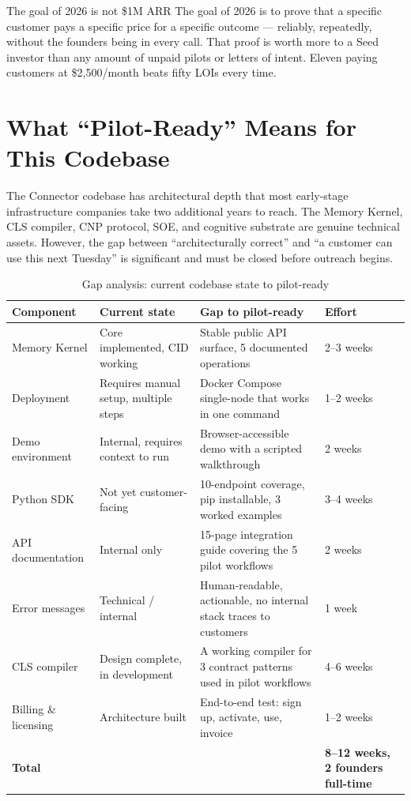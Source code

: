 \begin{insightbox}{The goal of 2026 is not \$1M ARR}
The goal of 2026 is to prove that a specific customer pays a specific price
for a specific outcome --- reliably, repeatedly, without the founders being
in every call. That proof is worth more to a Seed investor than any amount
of unpaid pilots or letters of intent. Eleven paying customers at
\$2,500/month beats fifty LOIs every time.
\end{insightbox}

\section*{What ``Pilot-Ready'' Means for This Codebase}

The Connector codebase has architectural depth that most early-stage
infrastructure companies take two additional years to reach. The Memory
Kernel, CLS compiler, CNP protocol, SOE, and cognitive substrate are
genuine technical assets. However, the gap between ``architecturally
correct'' and ``a customer can use this next Tuesday'' is significant and
must be closed before outreach begins.

\begin{table}[H]
\centering
\renewcommand{\arraystretch}{1.5}
\begin{tabularx}{\textwidth}{@{}lXll@{}}
\toprule
\textbf{Component} & \textbf{Current state} & \textbf{Gap to pilot-ready} &
\textbf{Effort} \\
\midrule
Memory Kernel      & Core implemented, CID working & Stable public API surface,
                     5 documented operations & 2--3 weeks \\
Deployment         & Requires manual setup, multiple steps & Docker Compose
                     single-node that works in one command & 1--2 weeks \\
Demo environment   & Internal, requires context to run & Browser-accessible
                     demo with a scripted walkthrough & 2 weeks \\
Python SDK         & Not yet customer-facing & 10-endpoint coverage, pip
                     installable, 3 worked examples & 3--4 weeks \\
API documentation  & Internal only & 15-page integration guide covering
                     the 5 pilot workflows & 2 weeks \\
Error messages     & Technical / internal & Human-readable, actionable, no
                     internal stack traces to customers & 1 week \\
CLS compiler       & Design complete, in development & A working compiler
                     for 3 contract patterns used in pilot workflows & 4--6 weeks \\
Billing \& licensing & Architecture built & End-to-end test: sign up, activate,
                     use, invoice & 1--2 weeks \\
\midrule
\textbf{Total} & & & \textbf{8--12 weeks, 2 founders full-time} \\
\bottomrule
\end{tabularx}
\caption{Gap analysis: current codebase state to pilot-ready}
\end{table}

